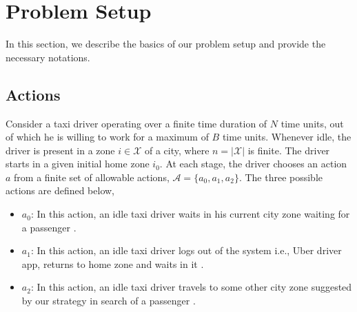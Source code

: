 
\section{Problem Setup}
\label{sec:problem_setup}

In this section, we describe the basics of our problem setup and provide the necessary notations.

\subsection{Actions}

Consider a taxi driver operating over a finite time duration of $N$ time units, out of which he is willing to work for a maximum of $B$ time units. Whenever idle, the driver is present in a zone $i \in \mathcal{X}$ of a city, where $n = |\mathcal{X}|$ is finite. The driver starts in a given initial home zone $i_0$. At each stage, the driver chooses an action $a$ from a finite set of allowable actions, $\mathcal{A} =\{a_0, a_1, a_2\}$. The three possible actions are defined below,

\begin{itemize}
    \item {\getpassenger} $a_0$: In this action, an idle taxi driver waits in his current city zone waiting for a passenger .
    \item {\gohome} $a_1$: In this action, an idle taxi driver logs out of the system i.e., Uber driver app, returns to home zone and waits in it .
    \item {\relocate} $a_2$: In this action, an idle taxi driver travels to some other city zone suggested by our strategy in search of a passenger .
\end{itemize}

